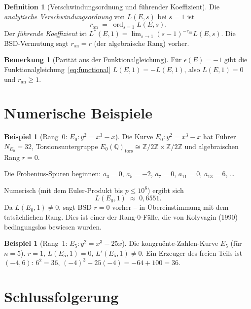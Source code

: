 \documentclass[12pt,a4paper]{amsart}
\theoremstyle{definition}
\newtheorem{definition}[theorem]{Definition}
\newtheorem{remark}[theorem]{Bemerkung}
\newtheorem{example}[theorem]{Beispiel}
\newcommand{\Z}{\mathbb{Z}}
\newcommand{\Q}{\mathbb{Q}}
\DeclareMathOperator{\ord}{ord}
\begin{document}
\begin{definition}[Verschwindungsordnung und f\"uhrender Koeffizient]
\label{def:order_vanishing}
Die \emph{analytische Verschwindungsordnung} von $L(E,s)$ bei $s=1$ ist
\[
  r_{\mathrm{an}} \;=\; \ord_{s=1} L(E,s).
\]
Der \emph{f\"uhrende Koeffizient} ist
$L^*(E,1) = \lim_{s \to 1} (s-1)^{-r_{\mathrm{an}}} L(E,s)$.
Die BSD-Vermutung sagt $r_{\mathrm{an}} = r$ (der algebraische Rang) vorher.
\end{definition}

\begin{remark}[Parit\"at aus der Funktionalgleichung]
F\"ur $\epsilon(E) = -1$ gibt die Funktionalgleichung~\eqref{eq:functional}
$L(E,1) = -L(E,1)$, also $L(E,1) = 0$ und $r_{\mathrm{an}} \ge 1$.
\end{remark}

\section{Numerische Beispiele}
\label{sec:numerics}

\begin{example}[Rang~0: $E_0\colon y^2 = x^3 - x$]
\label{ex:rank0}
Die Kurve $E_0\colon y^2 = x^3 - x$ hat F\"uhrer $N_{E_0} = 32$,
Torsionsuntergruppe $E_0(\Q)_{\mathrm{tors}} \cong \Z/2\Z \times \Z/2\Z$
und algebraischen Rang $r = 0$.

Die Frobenius-Spuren beginnen:
$a_3 = 0$, $a_5 = -2$, $a_7 = 0$, $a_{11} = 0$, $a_{13} = 6$, \ldots

Numerisch (mit dem Euler-Produkt bis $p \le 10^6$) ergibt sich
\[
  L(E_0, 1) \;\approx\; 0{,}6551.
\]
Da $L(E_0,1) \ne 0$, sagt BSD $r = 0$ vorher -- in \"Ubereinstimmung mit dem
tats\"achlichen Rang.  Dies ist einer der Rang-0-F\"alle, die von Kolyvagin
(1990) bedingungslos bewiesen wurden.
\end{example}

\begin{example}[Rang~1: $E_5\colon y^2 = x^3 - 25x$]
\label{ex:rank1}
Die kongru\"ente-Zahlen-Kurve $E_5$ (f\"ur $n=5$).
$r = 1$, $L(E_5,1) = 0$, $L'(E_5,1) \ne 0$.
Ein Erzeuger des freien Teils ist $(-4, 6)$:
$6^2 = 36$, $(-4)^3 - 25(-4) = -64 + 100 = 36$. \checkmark
\end{example}

\section{Schlussfolgerung}
\end{document}
